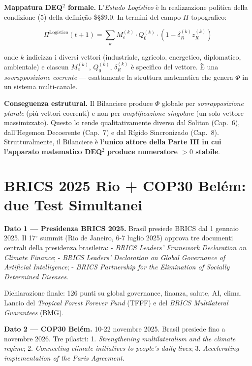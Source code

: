 \Proved{} \textbf{Mappatura DEQ$^2$ formale.} L'\emph{Estado Logístico} è
la realizzazione politica della condizione (5) della definição
\$\S\$9.0. In termini del campo \(\Pi\) topografico:

\[\Pi^{\text{Logístico}}(t+1) = \sum_{k} M_e^{(k)} \cdot Q_0^{(k)} \cdot (1 - \delta_R^{(k)} z_R^{(k)})\]

onde \(k\) indicizza i diversi vettori (industriale, agricolo,
energetico, diplomatico, ambientale) e ciascun \(M_e^{(k)}\),
\(Q_0^{(k)}\), \(\delta_R^{(k)}\) è specifico del vettore. È una
\emph{sovrapposizione coerente} --- esattamente la struttura matematica
che genera \(\Phi\) in un sistema multi-canale.

\Hypoth{} \textbf{Conseguenza estrutural.} Il Bilanciere produce
\(\Phi\) globale per \emph{sovrapposizione plurale} (più vettori
coerenti) e non per \emph{amplificazione singolare} (un solo vettore
massimizzato). Questo lo rende qualitativamente diverso dal Soliton
(Cap.~6), dall'Hegemon Decoerente (Cap.~7) e dal Rígido Sincronizado
(Cap.~8). Strutturalmente, il Bilanciere è \textbf{l'unico attore della
Parte III in cui l'apparato matematico DEQ$^2$ produce numeratore \(> 0\)
stabile}.



\section{BRICS 2025 Rio + COP30 Belém: due Test
Simultanei}\label{brics-2025-rio-cop30-beluxe9m-due-test-simultanei}

\Proved{} \textbf{Dato 1 --- Presidenza BRICS 2025.} Brasil presiede
BRICS dal 1 gennaio 2025. Il 17$^\circ$ summit (Rio de Janeiro, 6-7 luglio
2025) approva tre documenti centrali della presidenza brasileira: -
\emph{BRICS Leaders' Framework Declaration on Climate Finance}; -
\emph{BRICS Leaders' Declaration on Global Governance of Artificial
Intelligence}; - \emph{BRICS Partnership for the Elimination of Socially
Determined Diseases}.

Dichiarazione finale: 126 punti su global governance, finanza, salute,
AI, clima. Lancio del \emph{Tropical Forest Forever Fund} (TFFF) e del
\emph{BRICS Multilateral Guarantees} (BMG).

\Proved{} \textbf{Dato 2 --- COP30 Belém.} 10-22 novembre 2025. Brasil
presiede fino a novembre 2026. Tre pilastri: 1. \emph{Strengthening
multilateralism and the climate regime}; 2. \emph{Connecting climate
initiatives to people's daily lives}; 3. \emph{Accelerating
implementation of the Paris Agreement}.

